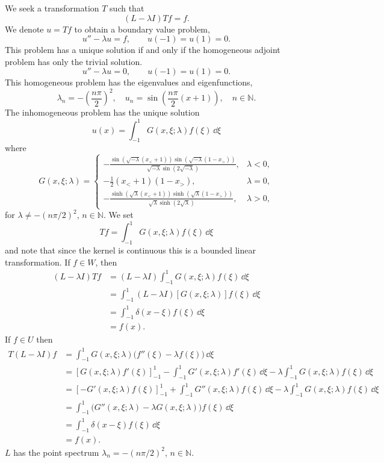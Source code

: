 \begin{Solution}
  We seek a transformation $T$ such that
  \[
  (L - \lambda I) T f = f.
  \]
  We denote $u = T f$ to obtain a boundary value problem,
  \[
  u'' - \lambda u = f, \qquad u(-1) = u(1) = 0.
  \]
  This problem has a unique solution if and only if the homogeneous 
  adjoint problem has only the trivial solution.
  \[
  u'' - \lambda u = 0, \qquad u(-1) = u(1) = 0.
  \]
  This homogeneous problem has the eigenvalues and eigenfunctions,
  \[
  \lambda_n = - \left( \frac{n \pi}{2} \right)^2, \quad
  u_n = \sin\left( \frac{n \pi}{2} (x+1) \right), \quad
  n \in \mathbb{N}.
  \]
  The inhomogeneous problem has the unique solution 
  \[
  u(x) = \int_{-1}^1 G(x,\xi;\lambda) f(\xi) \,\dd \xi
  \]
  where
  \[
  G(x,\xi;\lambda) = 
  \begin{cases}
    - \frac{ \sin \left( \sqrt{-\lambda} (x_< +1) \right)
      \sin \left( \sqrt{-\lambda} (1-x_>) \right) }
    { \sqrt{-\lambda} \sin \left( 2 \sqrt{-\lambda} \right) },
    &\lambda < 0, \\
    - \frac{1}{2} (x_< + 1) (1 - x_>), &\lambda = 0, \\
    - \frac{ \sinh \left( \sqrt{\lambda} (x_< +1) \right)
      \sinh \left( \sqrt{\lambda} (1-x_>) \right) }
    { \sqrt{\lambda} \sinh \left( 2 \sqrt{\lambda} \right) },
    &\lambda > 0,
  \end{cases}
  \]
  for $\lambda \neq - (n \pi / 2)^2$, $n \in \mathbb{N}$.  We set
  \[
  T f = \int_{-1}^1 G(x,\xi;\lambda) f(\xi) \,\dd \xi
  \]
  and note that since the kernel is continuous this is a bounded linear
  transformation.  If $f \in W$, then
  \begin{align*}
    (L - \lambda I) T f 
    &= (L - \lambda I) \int_{-1}^1 G(x,\xi;\lambda) f(\xi) \,\dd \xi \\
    &= \int_{-1}^1 (L - \lambda I)[G(x,\xi;\lambda)] f(\xi) \,\dd \xi \\
    &= \int_{-1}^1 \delta(x - \xi) f(\xi) \,\dd \xi \\
    &= f(x).
  \end{align*}
  If $f \in U$ then
  \begin{align*}
    T (L - \lambda I) f
    &= \int_{-1}^1 G(x,\xi;\lambda) \big( f''(\xi) - \lambda f(\xi) \big)
    \,\dd \xi \\
    &= \left[ G(x,\xi;\lambda) f'(\xi) \right]_{-1}^1
    - \int_{-1}^1 G'(x,\xi;\lambda) f'(\xi) \,\dd \xi 
    - \lambda \int_{-1}^1 G(x,\xi;\lambda) f(\xi) \,\dd \xi \\
    &= \left[ - G'(x,\xi;\lambda) f(\xi) \right]_{-1}^1
    + \int_{-1}^1 G''(x,\xi;\lambda) f(\xi) \,\dd \xi 
    - \lambda \int_{-1}^1 G(x,\xi;\lambda) f(\xi) \,\dd \xi \\
    &= \int_{-1}^1 \big( G''(x,\xi;\lambda) - \lambda G(x,\xi;\lambda) 
    \big) f(\xi) \,\dd \xi \\
    &= \int_{-1}^1 \delta(x - \xi) f(\xi) \,\dd \xi \\
    &= f(x).
  \end{align*}
  $L$ has the point spectrum $\lambda_n = - (n \pi / 2)^2$, $n \in \mathbb{N}$.
\end{Solution}




